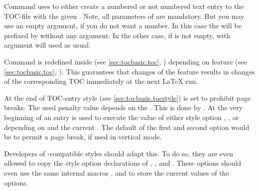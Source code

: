 \begin{Declaration}
\end{Declaration}
Command 
uses  to either create a numbered or not numbered text
entry to the TOC-file with the given . Note, all parameters
of  are mandatory. But you may use an empty
 argument, if you do not want a number. In this case the
 will be prefixed by  without any argument. In
the other case, if  is not empty,  with
argument  will used as usual.

Command  is redefined inside  (see
\autoref{sec:tocbasic.toc}, )
depending on feature  (see \autoref{sec:tocbasic.toc},
). This guarantees that changes of the
feature results in changes of the corresponding TOC immediately at the next
\LaTeX{} run.%
\EndIndexGroup


\begin{Declaration}
\end{Declaration}
At the end of TOC-entry style
 (see \autoref{sec:tocbasic.tocstyle})  is set
to prohibit page breaks. The used penalty value depends on the . This is done by . At the very
beginning of an entry  is used to
execute the value of either style option ,
, or  depending on
 and the current . The default of the
first and second option would be to permit a page break, if used in vertical
mode.

Developers of -compatible styles should adapt this. To do so,
they are even allowed to copy the style option declarations of
, , and
. These options should even use the same internal
macros ,
 and
 to store the current
values of the options.%
\EndIndexGroup


